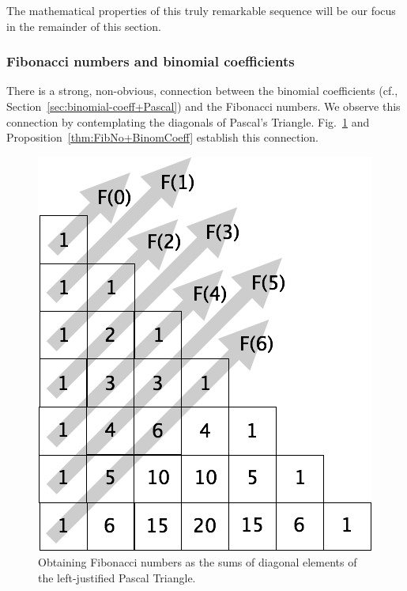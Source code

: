 The mathematical properties of this truly remarkable sequence will be our focus in the remainder of this section.


\subsubsection{Fibonacci numbers and binomial coefficients}
\label{sec:FibNo+BinomCoeff}


\noindent
There is a strong, non-obvious, connection between the binomial coefficients (cf., Section~\ref{sec:binomial-coeff+Pascal}) and the Fibonacci numbers.  We observe this connection by contemplating the diagonals of Pascal's Triangle.  Fig.~\ref{fig:FiboPascal} and Proposition~\ref{thm:FibNo+BinomCoeff} establish this connection.
\begin{figure}[htb]
\begin{center}
        \includegraphics[scale=0.3]{FiguresMaths//FiboPascal1}
\caption{Obtaining Fibonacci numbers as the sums of diagonal elements of the left-justified Pascal Triangle.}
\label{fig:FiboPascal}
\end{center}
\end{figure}

